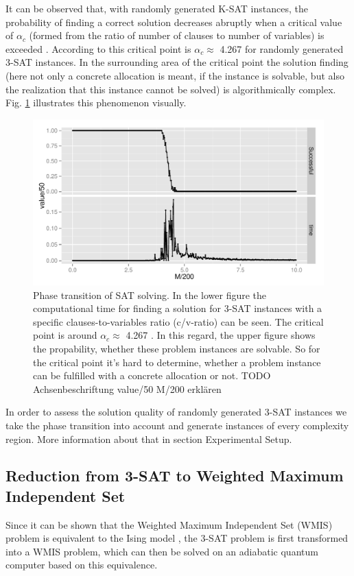 It can be observed that, with randomly generated K-SAT instances, the probability of finding a correct solution decreases abruptly when a critical value of $\alpha_{c}$ (formed from the ratio of number of clauses to number of variables) is exceeded \cite{monasson1996entropy}. According to \cite{mezard2002random} this critical point is $\alpha_{c} \approx $ 4.267 for randomly generated 3-SAT instances. In the surrounding area of the critical point the solution finding (here not only a concrete allocation is meant, if the instance is solvable, but also the realization that this instance cannot be solved) is algorithmically complex. Fig. \ref{fig:crit_sat} illustrates this phenomenon visually.

\begin{figure}
	\centering
	\includegraphics[width=.8\textwidth]{../material_2/plot_sat.pdf}
	\caption{Phase transition of SAT solving. In the lower figure the computational time for finding a solution for 3-SAT instances with a specific clauses-to-variables ratio (c/v-ratio) can be seen. The critical point is around $\alpha_{c} \approx $ 4.267 . In this regard, the upper figure shows the propability, whether these problem instances are solvable. So for the critical point it's hard to determine, whether a problem instance can be fulfilled with a concrete allocation or not. TODO Achsenbeschriftung value/50 M/200 erklären} \label{fig:crit_sat}
\end{figure}

In order to assess the solution quality of randomly generated 3-SAT instances we take the phase transition into account
and generate instances of every complexity region. More information about that in section Experimental Setup.

\subsection{Reduction from 3-SAT to Weighted Maximum Independent Set}
Since it can be shown that the Weighted Maximum Independent Set (WMIS) problem is equivalent to the Ising model \cite{choi2008minor}, the 3-SAT problem is first transformed into a WMIS problem, which can then be solved on an adiabatic quantum computer based on this equivalence.\\

